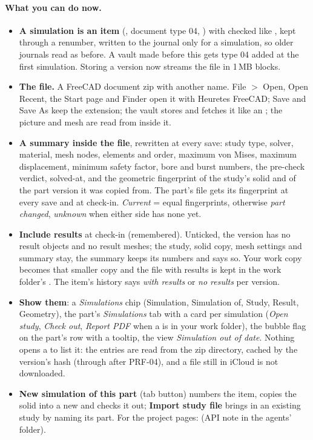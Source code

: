 \paragraph{What you can do now.}
\begin{itemize}[nosep]
  \item \textbf{A simulation is an item} (, document type 04, ) with
         checked like , kept through a renumber, written to the journal only for a
        simulation, so older journals read as before. A vault made before this gets type 04 added at the first
        simulation. Storing a version now streams the file in 1\,MB blocks.
  \item \textbf{The  file.} A FreeCAD document zip with another name. File $>$ Open, Open Recent, the Start
        page and Finder open it with Heuretes FreeCAD; Save and Save As keep the extension; the vault stores and fetches it like
        an ; the picture and mesh are read from inside it.
  \item \textbf{A summary inside the file}, rewritten at every save: study type, solver, material, mesh nodes, elements and
        order, maximum von Mises, maximum displacement, minimum safety factor, bore and burst numbers, the pre-check verdict,
        solved-at, and the geometric fingerprint of the study's solid and of the part version it was copied from. The part's
        file gets its fingerprint at every save and at check-in. \emph{Current} = equal fingerprints, otherwise
        \emph{part changed}, \emph{unknown} when either side has none yet.
  \item \textbf{Include results} at check-in (remembered). Unticked, the version has no result objects and no result
        meshes; the study, solid copy, mesh settings and summary stay, the summary keeps its numbers and says so. Your work
        copy becomes that smaller copy and the file with results is kept in the work folder's . The item's
        history says \emph{with results} or \emph{no results} per version.
  \item \textbf{Show them}: a \emph{Simulations} chip (Simulation, Simulation of, Study, Result, Geometry), the part's
        \emph{Simulations} tab with a card per simulation (\emph{Open study}, \emph{Check out}, \emph{Report PDF} when a
         is in your work folder), the bubble flag on the part's row with a tooltip, the view
        \emph{Simulation out of date}. Nothing opens a  to list it: the entries are read from the zip directory,
        cached by the version's hash (through  after PRF-04), and a file still in iCloud is not downloaded.
  \item \textbf{New simulation of this part} (tab button) numbers the item, copies the solid into a new  and checks
        it out; \textbf{Import study file} brings in an existing study by naming its part. For the project pages:
         (API note in the agents' folder).
\end{itemize}

